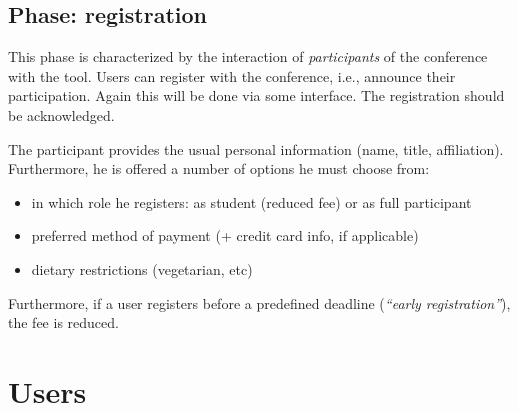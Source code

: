 \subsection{Phase: registration}
\label{sec:registration}

This phase is characterized by the interaction of \emph{participants} of
the conference with the tool. Users can register with the conference, i.e.,
announce their participation. Again this will be done via some interface.
The registration should be acknowledged.  

The participant provides the usual personal information (name, title,
affiliation). Furthermore, he is offered a number of options he must choose
from:
\begin{itemize}
\item in which role he registers: as student (reduced fee) or as full
  participant
\item preferred method of payment (+ credit card info, if applicable)
\item dietary restrictions (vegetarian, etc)
\end{itemize}

Furthermore, if a user registers before a predefined deadline
(\emph{``early registration''}), the fee is reduced.













\section{Users}
\label{sec:users}

